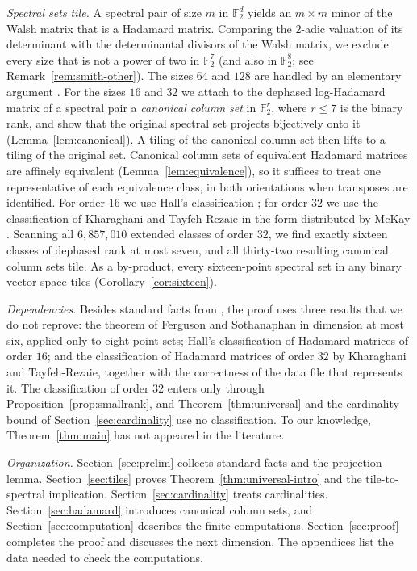 \documentclass[11pt]{amsart}
\theoremstyle{definition}
\theoremstyle{remark}
\numberwithin{equation}{section}
\numberwithin{table}{section}
\newcommand{\F}{\mathbb{F}}
\begin{document}
\emph{Spectral sets tile.} A spectral pair of size $m$ in $\F_2^d$ yields an $m\times m$ minor of the Walsh matrix that is a Hadamard matrix. Comparing the $2$-adic valuation of its determinant with the determinantal divisors of the Walsh matrix, we exclude every size that is not a power of two in $\F_2^7$ (and also in $\F_2^8$; see Remark~\ref{rem:smith-other}). The sizes $64$ and $128$ are handled by an elementary argument \cite{AAB17}. For the sizes $16$ and $32$ we attach to the dephased log-Hadamard matrix of a spectral pair a \emph{canonical column set} in $\F_2^r$, where $r\le7$ is the binary rank, and show that the original spectral set projects bijectively onto it (Lemma~\ref{lem:canonical}). A tiling of the canonical column set then lifts to a tiling of the original set. Canonical column sets of equivalent Hadamard matrices are affinely equivalent (Lemma~\ref{lem:equivalence}), so it suffices to treat one representative of each equivalence class, in both orientations when transposes are identified. For order $16$ we use Hall's classification \cite{Hal61}; for order $32$ we use the classification of Kharaghani and Tayfeh-Rezaie \cite{KT13} in the form distributed by McKay \cite{McK}. Scanning all $6{,}857{,}010$ extended classes of order $32$, we find exactly sixteen classes of dephased rank at most seven, and all thirty-two resulting canonical column sets tile. As a by-product, every sixteen-point spectral set in any binary vector space tiles (Corollary~\ref{cor:sixteen}).

\emph{Dependencies.} Besides standard facts from \cite{AAB17}, the proof uses three results that we do not reprove: the theorem of Ferguson and Sothanaphan in dimension at most six, applied only to eight-point sets; Hall's classification of Hadamard matrices of order $16$; and the classification of Hadamard matrices of order $32$ by Kharaghani and Tayfeh-Rezaie, together with the correctness of the data file that represents it. The classification of order $32$ enters only through Proposition~\ref{prop:smallrank}, and Theorem~\ref{thm:universal} and the cardinality bound of Section~\ref{sec:cardinality} use no classification. To our knowledge, Theorem~\ref{thm:main} has not appeared in the literature.

\emph{Organization.} Section~\ref{sec:prelim} collects standard facts and the projection lemma. Section~\ref{sec:tiles} proves Theorem~\ref{thm:universal-intro} and the tile-to-spectral implication. Section~\ref{sec:cardinality} treats cardinalities. Section~\ref{sec:hadamard} introduces canonical column sets, and Section~\ref{sec:computation} describes the finite computations. Section~\ref{sec:proof} completes the proof and discusses the next dimension. The appendices list the data needed to check the computations.
\end{document}
